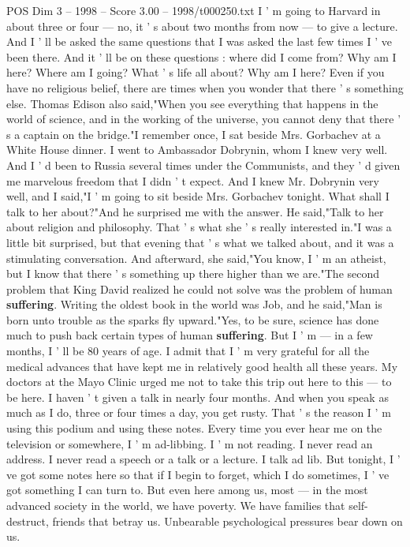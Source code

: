 \begin{textsample}{POS Dim 3 – 1998 – Score 3.00 – 1998/t000250.txt}
I ' m going to Harvard in about three or four — no, it ' s about two months from now — to give a lecture.
And I ' ll be asked the same questions that I was asked the last few times I ' ve been there.
And it ' ll be on these questions : where did I come from?
Why am I here?
Where am I going?
What ' s life all about?
Why am I here?
Even if you have no religious belief, there are times when you wonder that there ' s something else.
Thomas Edison also said,"When you see everything that happens in the world of science, and in the working of the universe, you cannot deny that there ' s a captain on the bridge."I remember once, I sat beside Mrs.
Gorbachev at a White House dinner.
I went to Ambassador Dobrynin, whom I knew very well.
And I ' d been to Russia several times under the Communists, and they ' d given me marvelous freedom that I didn ' t expect.
And I knew Mr.
Dobrynin very well, and I said,"I ' m going to sit beside Mrs.
Gorbachev tonight.
What shall I talk to her about?"And he surprised me with the answer.
He said,"Talk to her about religion and philosophy.
That ' s what she ' s really interested in."I was a little bit surprised, but that evening that ' s what we talked about, and it was a stimulating conversation.
And afterward, she said,"You know, I ' m an atheist, but I know that there ' s something up there higher than we are."The second problem that King David realized he could not solve was the problem of human \textbf{suffering}.
Writing the oldest book in the world was Job, and he said,"Man is born unto trouble as the sparks fly upward."Yes, to be sure, science has done much to push back certain types of human \textbf{suffering}.
But I ' m — in a few months, I ' ll be 80 years of age.
I admit that I ' m very grateful for all the medical advances that have kept me in relatively good health all these years.
My doctors at the Mayo Clinic urged me not to take this trip out here to this — to be here.
I haven ' t given a talk in nearly four months.
And when you speak as much as I do, three or four times a day, you get rusty.
That ' s the reason I ' m using this podium and using these notes.
Every time you ever hear me on the television or somewhere, I ' m ad-libbing.
I ' m not reading.
I never read an address.
I never read a speech or a talk or a lecture.
I talk ad lib.
But tonight, I ' ve got some notes here so that if I begin to forget, which I do sometimes, I ' ve got something I can turn to.
But even here among us, most — in the most advanced society in the world, we have poverty.
We have families that self-destruct, friends that betray us.
Unbearable psychological pressures bear down on us.

\end{textsample}
